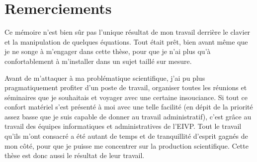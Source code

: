 \chapter*{Remerciements}

Ce mémoire n'est bien sûr pas l'unique résultat de mon travail derrière le clavier et la manipulation de quelques équations. Tout était prêt, bien avant même que je ne songe à m'engager dans cette thèse, pour que je n'ai plus qu'à confortablement à m'installer dans un sujet taillé sur mesure.

Avant de m'attaquer à ma problématique scientifique, j'ai pu plus pragmatiquement profiter d'un poste de travail, organiser toutes les réunions et séminaires que je souhaitais et voyager avec une certaine insouciance. Si tout ce confort matériel s'est présenté à moi avec une telle facilité (en dépit de la priorité assez basse que je suis capable de donner au travail administratif), c'est grâce au travail des équipes informatiques et administratives de l'EIVP. Tout le travail qu'ils m'ont consacré a été autant de temps et de tranquillité d'esprit gagnés de mon côté, pour que je puisse me concentrer sur la production scientifique. Cette thèse est donc aussi le résultat de leur travail.

